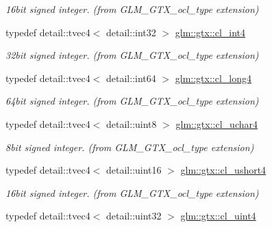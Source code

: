 \begin{DoxyCompactItemize}
\begin{DoxyCompactList}\small\item\em 16bit signed integer. (from G\+L\+M\+\_\+\+G\+T\+X\+\_\+ocl\+\_\+type extension) \end{DoxyCompactList}\item 
\hypertarget{group__gtx__ocl__type_ga3f94c333cc634b0270074874f49a1218}{}typedef detail\+::tvec4$<$ detail\+::int32 $>$ \hyperlink{group__gtx__ocl__type_ga3f94c333cc634b0270074874f49a1218}{glm\+::gtx\+::cl\+\_\+int4}\label{group__gtx__ocl__type_ga3f94c333cc634b0270074874f49a1218}

\begin{DoxyCompactList}\small\item\em 32bit signed integer. (from G\+L\+M\+\_\+\+G\+T\+X\+\_\+ocl\+\_\+type extension) \end{DoxyCompactList}\item 
\hypertarget{group__gtx__ocl__type_gaa005f062e947ced4b091d57680f45291}{}typedef detail\+::tvec4$<$ detail\+::int64 $>$ \hyperlink{group__gtx__ocl__type_gaa005f062e947ced4b091d57680f45291}{glm\+::gtx\+::cl\+\_\+long4}\label{group__gtx__ocl__type_gaa005f062e947ced4b091d57680f45291}

\begin{DoxyCompactList}\small\item\em 64bit signed integer. (from G\+L\+M\+\_\+\+G\+T\+X\+\_\+ocl\+\_\+type extension) \end{DoxyCompactList}\item 
\hypertarget{group__gtx__ocl__type_ga26783e5d129d6ab7e02e9e4f096f2c57}{}typedef detail\+::tvec4$<$ detail\+::uint8 $>$ \hyperlink{group__gtx__ocl__type_ga26783e5d129d6ab7e02e9e4f096f2c57}{glm\+::gtx\+::cl\+\_\+uchar4}\label{group__gtx__ocl__type_ga26783e5d129d6ab7e02e9e4f096f2c57}

\begin{DoxyCompactList}\small\item\em 8bit signed integer. (from G\+L\+M\+\_\+\+G\+T\+X\+\_\+ocl\+\_\+type extension) \end{DoxyCompactList}\item 
\hypertarget{group__gtx__ocl__type_gafed1544df211806a76ba59122dc3572d}{}typedef detail\+::tvec4$<$ detail\+::uint16 $>$ \hyperlink{group__gtx__ocl__type_gafed1544df211806a76ba59122dc3572d}{glm\+::gtx\+::cl\+\_\+ushort4}\label{group__gtx__ocl__type_gafed1544df211806a76ba59122dc3572d}

\begin{DoxyCompactList}\small\item\em 16bit signed integer. (from G\+L\+M\+\_\+\+G\+T\+X\+\_\+ocl\+\_\+type extension) \end{DoxyCompactList}\item 
\hypertarget{group__gtx__ocl__type_ga7902bf3b5c5622f62ee89689a8203cde}{}typedef detail\+::tvec4$<$ detail\+::uint32 $>$ \hyperlink{group__gtx__ocl__type_ga7902bf3b5c5622f62ee89689a8203cde}{glm\+::gtx\+::cl\+\_\+uint4}\label{group__gtx__ocl__type_ga7902bf3b5c5622f62ee89689a8203cde}


\end{DoxyCompactItemize}
